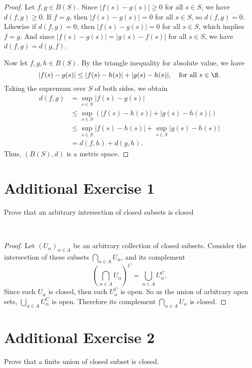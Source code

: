 \documentclass[12pt]{article}
\newenvironment{problem}
    {\begin{lrbox}{\mybox}\begin{minipage}{\textwidth-10pt}}
    {\end{minipage}\end{lrbox}\framebox[6.5in]{\usebox{\mybox}}\\}
\begin{document}
\begin{proof}
    Let $f,g\in B(S)$. Since $|f(s)-g(s)|\geq 0$ for all $s\in S$, we have $d(f,g)\geq0$. If $f=g$, then $|f(s)-g(s)|=0$ for all $s\in S$, so $d(f,g)=0$. Likewise if $d(f,g)=0$, then $|f(s)-g(s)|=0$ for all $s\in S$, which implies $f=g$. And since $|f(s)-g(s)| = |g(s)-f(s)|$ for all $s\in S$, we have $d(f,g) = d(g,f)$.
    
    Now let $f,g,h\in B(S)$. By the triangle inequality for absolute value, we have
    \[|f(s)-g(s)| \leq |f(s)-h(s)| + |g(s)-h(s)|, \quad \text{for all } s\in\S.\]
    Taking the supremum over $S$ of both sides, we obtain
    \begin{align*}
        d(f,g) 
            &= \sup_{s\in S}|f(s)-g(s)| \\
            &\leq \sup_{s\in S}(|f(s)-h(s)| + |g(s)-h(s)|) \\
            &\leq \sup_{s\in S}|f(s)-h(s)| + \sup_{s\in S}|g(s)-h(s)| \\
            &= d(f,h) + d(g,h).
    \end{align*}
    Thus, $(B(S),d)$ is a metric space.
    
\end{proof}

\section*{Additional Exercise 1}
\begin{problem}
    Prove that an arbitrary intersection of closed subsets is closed
\end{problem}

\begin{proof}
    Let $(U_\alpha)_{\alpha\in A}$ be an arbitrary collection of closed subsets. Consider the intersection of these subsets $\bigcap_{\alpha\in A}U_\alpha$, and its complement
    \[\left(\bigcap_{\alpha\in A}U_\alpha\right)^C = \bigcup_{\alpha\in A}U_\alpha^C.\]
    Since each $U_\alpha$ is closed, then each $U_\alpha^C$ is open. So as the union of arbitrary open sets, $\bigcup_{\alpha\in A}U_\alpha^C$ is open. Therefore its complement $\bigcap_{\alpha\in A}U_\alpha$ is closed. 
    
\end{proof}

\newpage
\section*{Additional Exercise 2}
\begin{problem}
    Prove that a finite union of closed subset is closed.
\end{problem}
\end{document}
